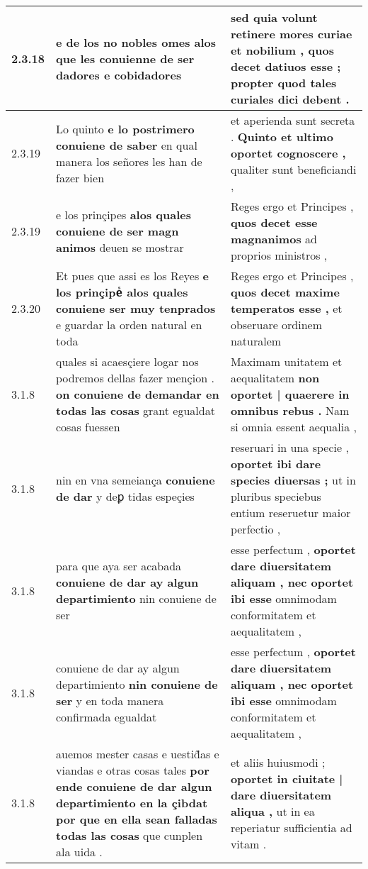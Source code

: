 \begin{tabular}{|p{1cm}|p{6.5cm}|p{6.5cm}|}
2.3.18 & e de los no nobles omes alos \textbf{ que les conuienne de ser dadores } e cobidadores & sed quia volunt retinere mores curiae et nobilium , \textbf{ quos decet datiuos esse ; } propter quod tales curiales dici debent . \\\hline
2.3.19 & Lo quinto \textbf{ e lo postrimero conuiene de saber } en qual manera los señores les han de fazer bien & et aperienda sunt secreta . \textbf{ Quinto et ultimo oportet cognoscere , } qualiter sunt beneficiandi , \\\hline
2.3.19 & e los prinçipes \textbf{ alos quales conuiene de ser magn animos } deuen se mostrar & Reges ergo et Principes , \textbf{ quos decet esse magnanimos } ad proprios ministros , \\\hline
2.3.20 & Et pues que assi es los Reyes \textbf{ e los prinçipeᷤ alos quales conuiene ser muy tenprados } e guardar la orden natural en toda & Reges ergo et Principes , \textbf{ quos decet maxime temperatos esse , } et obseruare ordinem naturalem \\\hline
3.1.8 & quales si acaesçiere logar nos podremos dellas fazer mençion . \textbf{ on conuiene de demandar en todas las cosas } grant egualdat cosas fuessen & Maximam unitatem et aequalitatem \textbf{ non oportet | quaerere in omnibus rebus . } Nam si omnia essent aequalia , \\\hline
3.1.8 & nin en vna semeiança \textbf{ conuiene de dar } y deꝑ tidas espeçies & reseruari in una specie , \textbf{ oportet ibi dare species diuersas ; } ut in pluribus speciebus entium reseruetur maior perfectio , \\\hline
3.1.8 & para que aya ser acabada \textbf{ conuiene de dar ay algun departimiento } nin conuiene de ser & esse perfectum , \textbf{ oportet dare diuersitatem aliquam , nec oportet ibi esse } omnimodam conformitatem et aequalitatem , \\\hline
3.1.8 & conuiene de dar ay algun departimiento \textbf{ nin conuiene de ser } y en toda manera confirmada egualdat & esse perfectum , \textbf{ oportet dare diuersitatem aliquam , nec oportet ibi esse } omnimodam conformitatem et aequalitatem , \\\hline
3.1.8 & auemos mester casas e uestid̃as e viandas e otras cosas tales \textbf{ por ende conuiene de dar algun departimiento en la çibdat por que en ella sean falladas todas las cosas } que cunplen ala uida . & et aliis huiusmodi ; \textbf{ oportet in ciuitate | dare diuersitatem aliqua , } ut in ea reperiatur sufficientia ad vitam . \\\hline

\end{tabular}
